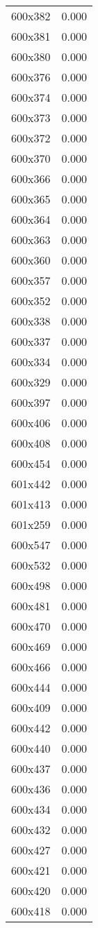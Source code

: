 \begin{table}
\begin{tabular}{lr}
600x382 & 0.000 \\
600x381 & 0.000 \\
600x380 & 0.000 \\
600x376 & 0.000 \\
600x374 & 0.000 \\
600x373 & 0.000 \\
600x372 & 0.000 \\
600x370 & 0.000 \\
600x366 & 0.000 \\
600x365 & 0.000 \\
600x364 & 0.000 \\
600x363 & 0.000 \\
600x360 & 0.000 \\
600x357 & 0.000 \\
600x352 & 0.000 \\
600x338 & 0.000 \\
600x337 & 0.000 \\
600x334 & 0.000 \\
600x329 & 0.000 \\
600x397 & 0.000 \\
600x406 & 0.000 \\
600x408 & 0.000 \\
600x454 & 0.000 \\
601x442 & 0.000 \\
601x413 & 0.000 \\
601x259 & 0.000 \\
600x547 & 0.000 \\
600x532 & 0.000 \\
600x498 & 0.000 \\
600x481 & 0.000 \\
600x470 & 0.000 \\
600x469 & 0.000 \\
600x466 & 0.000 \\
600x444 & 0.000 \\
600x409 & 0.000 \\
600x442 & 0.000 \\
600x440 & 0.000 \\
600x437 & 0.000 \\
600x436 & 0.000 \\
600x434 & 0.000 \\
600x432 & 0.000 \\
600x427 & 0.000 \\
600x421 & 0.000 \\
600x420 & 0.000 \\
600x418 & 0.000 \\

\end{tabular}
\end{table}
